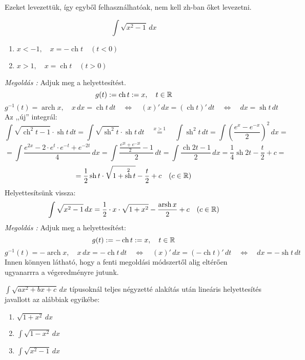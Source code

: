 \documentclass[a4paper,11.5pt]{article}
\DeclareMathOperator{\sh}{sh}
\DeclareMathOperator{\ch}{ch}
\DeclareMathOperator{\arsh}{arsh}
\DeclareMathOperator{\arch}{arch}
\begin{document}
	\begin{note}
		Ezeket levezettük, így egyből felhasználhatóak, nem kell zh-ban őket levezetni.
	\end{note}
	\begin{exercise}
		\[ \int\sqrt{x^2-1}\,dx \]
		\begin{enumerate}
			\item $x<-1,\quad x=-\ch t \quad (t<0)$
			\item $x>1,\quad x=\ch t \quad (t>0)$
		\end{enumerate}
		\textit{Megoldás :} Adjuk meg a helyettesítést.
		\[ g(t):=\ch t:=x, \quad t\in\R \]
		\[ g^{-1}(t)=\arch x,\quad x\,dx=\ch t\,dt\quad \Leftrightarrow\quad (x)'\,dx=(\ch t)'\,dt\quad \Leftrightarrow\quad dx=\sh t\,dt \]
		Az ,,új'' integrál:
		\[ \int\sqrt{\ch^2t-1}\cdot\sh t\,dt=\int\sqrt{\sh^2t}\cdot\sh t\,dt\quad \overset{x>1}{=}\quad \int\sh^2t\,dt=\int\left(\frac{e^x-e^{-x}}{2}\right)^2\,dx=\]
		\[=\int\frac{e^{2x}-2\cdot e^{t}\cdot e^{-t}+e^{-2t} }{4}\,dx=\int\frac{\frac{e^{2t}+e^{-2t}}{2}-1}{2}\,dt=\int\frac{\ch2t-1}{2}\,dx=\frac{1}{4}\sh2t-\frac{t}{2}+c=\]
		\[=\frac{1}{2}\sh t\cdot\sqrt{1+\sh^2 t}-\frac{t}{2}+c\quad (c\in\R) \]
		Helyettesítsünk vissza:
		\[ \int\sqrt{x^2-1}\,dx=\frac{1}{2}\cdot x\cdot\sqrt{1+x^2}-\frac{\arsh x}{2}+c\quad (c\in\R) \]
		\textit{Megoldás :} Adjuk meg a helyettesítést:
		\[ g(t):=-\ch t:=x, \quad t\in\R \]
		\[ g^{-1}(t)=-\arch x,\quad x\,dx=-\ch t\,dt\quad \Leftrightarrow\quad (x)'\,dx=(-\ch t)'\,dt\quad \Leftrightarrow\quad dx=-\sh t\,dt \]
		Innen könnyen látható, hogy a fenti megoldási módszertől alig eltérően ugyanarrra a végeredményre jutunk.
	\end{exercise}
	\begin{note}
		$\int\sqrt{ax^2+bx+c}\,dx$ típusoknál teljes négyzetté alakítás után lineáris helyettesítés javallott az alábbiak egyikébe:
		\begin{enumerate}
			\item $\sqrt{1+x^2}\,dx$
			\item $\int\sqrt{1-x^2}\,dx$
			\item $\int\sqrt{x^2-1}\,dx$
		\end{enumerate}
	\end{note}
\end{document}
